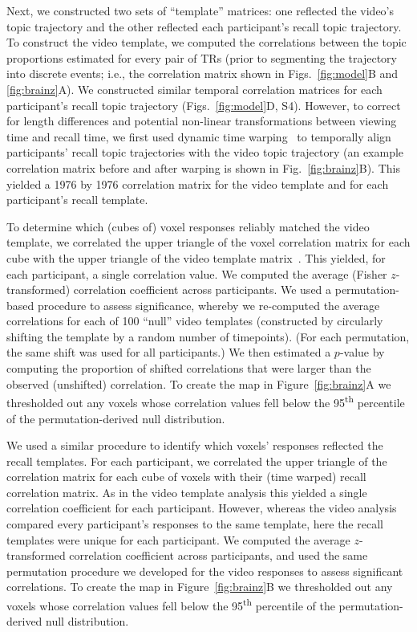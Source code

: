 \documentclass{article}
\newcommand{\corrmats}{S4}
\begin{document}
Next, we constructed two sets of ``template'' matrices: one reflected the video's topic trajectory and the other reflected each participant's recall topic trajectory.  To construct the video template, we computed the correlations between the topic proportions estimated for every pair of TRs (prior to segmenting the trajectory into discrete events; i.e., the correlation matrix shown in Figs.~\ref{fig:model}B and \ref{fig:brainz}A).  We constructed similar temporal correlation matrices for each participant's recall topic trajectory (Figs.~\ref{fig:model}D, \corrmats).  However, to correct for length differences and potential non-linear transformations between viewing time and recall time, we first used dynamic time warping~\citep{BernClif94} to temporally align participants' recall topic trajectories with the video topic trajectory (an example correlation matrix before and after warping is shown in Fig.~\ref{fig:brainz}B).  This yielded a 1976 by 1976 correlation matrix for the video template and for each participant's recall template.

To determine which (cubes of) voxel responses reliably matched the video template, we correlated the upper triangle of the voxel correlation matrix for each cube with the upper triangle of the video template matrix~\citep{KrieEtal08b}.  This yielded, for each participant, a single correlation value.  We computed the average (Fisher $z$-transformed) correlation coefficient across participants.  We used a permutation-based procedure to assess significance, whereby we re-computed the average correlations for each of 100 ``null'' video templates (constructed by circularly shifting the template by a random number of timepoints).  (For each permutation, the same shift was used for all participants.)  We then estimated a $p$-value by computing the proportion of shifted correlations that were larger than the observed (unshifted) correlation.  To create the map in Figure~\ref{fig:brainz}A we thresholded out any voxels whose correlation values fell below the 95\textsuperscript{th} percentile of the permutation-derived null distribution.

We used a similar procedure to identify which voxels' responses reflected the recall templates.  For each participant, we correlated the upper triangle of the correlation matrix for each cube of voxels with their (time warped) recall correlation matrix.  As in the video template analysis this yielded a single correlation coefficient for each participant.  However, whereas the video analysis compared every participant's responses to the same template, here the recall templates were unique for each participant.  We computed the average $z$-transformed correlation coefficient across participants, and used the same permutation procedure we developed for the video responses to assess significant correlations.  To create the map in Figure~\ref{fig:brainz}B we thresholded out any voxels whose correlation values fell below the 95\textsuperscript{th} percentile of the permutation-derived null distribution.
\end{document}
